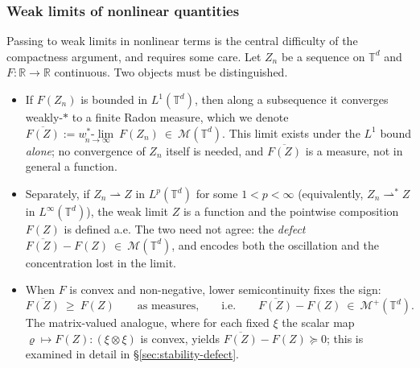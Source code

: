 \documentclass[12pt,a4paper,twoside]{article}
\newcommand{\Ov}[1]{\overline{#1}}
\newcommand{\vr}{\varrho}
\numberwithin{equation}{section}%
\begin{document}
\subsubsection*{Weak limits of nonlinear quantities}
Passing to weak limits in nonlinear terms is the central difficulty of the compactness
argument, and requires some care. Let $Z_n$ be a sequence on $\mathbb T^d$ and
$F:\mathbb R\to\mathbb R$ continuous. Two objects must be distinguished.
\begin{itemize}[leftmargin=*]
	\item If $F(Z_n)$ is bounded in $L^1(\mathbb T^d)$, then along a subsequence it converges
	weakly-$*$ to a finite Radon measure, which we denote $\displaystyle \Ov{F(Z)} := \underset{n\to\infty}{w^*\text{-}\lim}\ F(Z_n)\ \in\ \mathcal M(\mathbb T^d)$.
	This limit exists under the $L^1$ bound \emph{alone}; no convergence of $Z_n$ itself is
	needed, and $\Ov{F(Z)}$ is a measure, not in general a function.
	
	\item Separately, if $Z_n\rightharpoonup Z$ in $L^p(\mathbb T^d)$ for some $1<p<\infty$
	(equivalently, $Z_n\rightharpoonup^{\ast} Z$ in $L^\infty(\mathbb T^d)$), the weak limit $Z$
	is a function and the pointwise composition $F(Z)$ is defined a.e. The two need not agree:
	the \emph{defect} $	\Ov{F(Z)} - F(Z)\ \in\ \mathcal M(\mathbb T^d) $, and encodes both the
	oscillation and the concentration lost in the limit.
	\item When $F$ is convex and non-negative, lower semicontinuity fixes the sign:
	\begin{equation}\label{defect1}
		\Ov{F(Z)}\ \ge\ F(Z)
		\qquad\text{as measures,}\qquad\text{i.e.}\qquad
		\Ov{F(Z)} - F(Z)\ \in\ \mathcal M^+(\mathbb T^d).
	\end{equation}
	The matrix-valued analogue, where for each fixed $\xi$ the scalar map
	$\vr\mapsto F(Z):(\xi\otimes\xi)$ is convex, yields $\Ov{F(Z)}-F(Z)\succeq0$; this is examined
	in detail in \S\ref{sec:stability-defect}.
\end{itemize}
\end{document}
